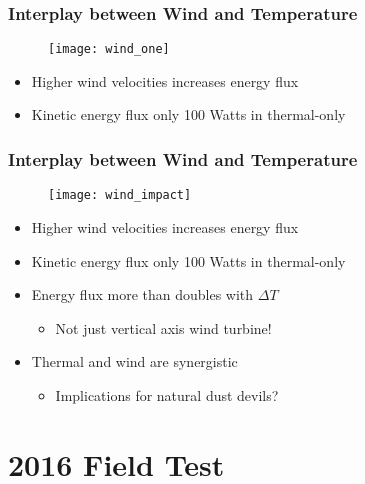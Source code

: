 \documentclass[mathserif]{beamer}
\begin{document}
%
%
%
\begin{frame}
 \frametitle{Interplay between Wind and Temperature}

 \begin{figure}[htb]
  \centering
  \texttt{[image: wind\_one]}
 \end{figure}

 \begin{itemize}
  \item Higher wind velocities increases energy flux
  \item Kinetic energy flux only 100 Watts in thermal-only
 \end{itemize} 
\end{frame}

%
%
%
\begin{frame}
 \frametitle{Interplay between Wind and Temperature}

 \begin{figure}[htb]
  \centering
    \texttt{[image: wind\_impact]}
 \end{figure}

  \begin{itemize}
   \item Higher wind velocities increases energy flux
   \item Kinetic energy flux only 100 Watts in thermal-only
   \item Energy flux more than doubles with $\Delta T$
   \begin{itemize}
    \item Not just vertical axis wind turbine!
   \end{itemize} 
   \item Thermal and wind are synergistic
	 \begin{itemize}
	  \item Implications for natural dust devils? 
	 \end{itemize}
  \end{itemize}
\end{frame}
 


\section{2016 Field Test}
%
%

\end{document}
